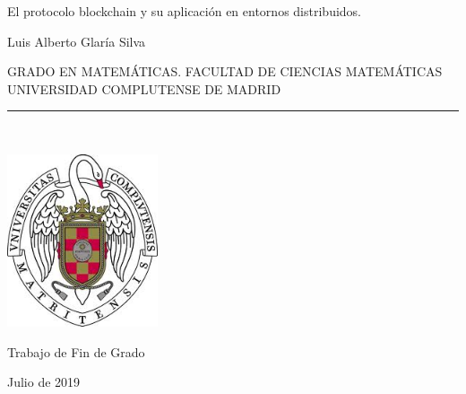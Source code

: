 \begin{center}

   \vspace{1cm}


   {\Large El protocolo blockchain y su aplicación en entornos distribuidos.}\\

   \vspace{0.5cm}



   \vspace{0.5cm}



   {\large Luis Alberto Glaría Silva}\\

   \vspace{0.5cm}




   GRADO EN MATEMÁTICAS. FACULTAD DE CIENCIAS MATEMÁTICAS\\
   UNIVERSIDAD COMPLUTENSE DE MADRID \\


   \vspace{0.65cm}
   \rule{2in}{0.5pt}\\
   \vspace{0.85cm}

  \includegraphics[height=2in]{figures/escudo.jpg}
  

   \vspace{0.5cm}
Trabajo de Fin de Grado

   \vspace{0.5cm}






  Julio de 2019\\
   \vspace{1cm}

\end{center}

